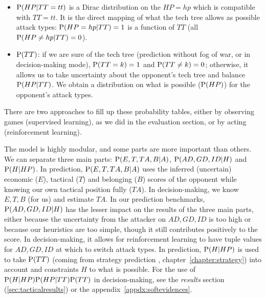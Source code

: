 \begin{itemize}
\item $\mathrm{P}(HP|TT=tt)$ is a Dirac distribution on the $HP=hp$ which is compatible with $TT=tt$. It is the direct mapping of what the tech tree allows as possible attack types: $\mathrm{P}(HP=hp|TT)=1$ is a function of $TT$ (all $\mathrm{P}(HP\neq hp|TT)=0$).

\item $\mathrm{P}(TT)$: if we are sure of the tech tree (prediction without fog of war, or in decision-making mode), $\mathrm{P}(TT=k)=1$ and $\mathrm{P}(TT\neq k)=0$; otherwise, it allows us to take uncertainty about the opponent's tech tree and balance $\mathrm{P}(HP|TT)$. We obtain a distribution on what is possible ($\mathrm{P}(HP)$) for the opponent's attack types.
\end{itemize}

There are two approaches to fill up these probability tables, either by observing games (supervised learning), as we did in the evaluation section, or by acting (reinforcement learning). %

The model is highly modular, and some parts are more important than others. We can separate three main parts: $\mathrm{P}(E,T,TA,B|A)$, $\mathrm{P}(AD,GD,ID|H)$ and $\mathrm{P}(H|HP)$. In prediction, $\mathrm{P}(E,T,TA,B|A)$ uses the inferred (uncertain) economic ($E$), tactical ($T$) and belonging ($B$) scores of the opponent while knowing our own tactical position fully ($TA$). In decision-making, we know $E,T,B$ (for us) and estimate $TA$. In our prediction benchmarks, $\mathrm{P}(AD,GD,ID|H)$ has the lesser impact on the results of the three main parts, either because the uncertainty from the attacker on $AD,GD,ID$ is too high or because our heuristics are too simple, though it still contributes positively to the score. In decision-making, it allows for reinforcement learning to have tuple values for $AD,GD,ID$ at which to switch attack types. In prediction, $\mathrm{P}(H|HP)$ is used to take $\mathrm{P}(TT)$ (coming from strategy prediction \citep{SYNNAEVE:StratPred}, chapter~\ref{chapter:strategy}) into account and constraints $H$ to what is possible. For the use of $\mathrm{P}(H|HP)\mathrm{P}(HP|TT)\mathrm{P}(TT)$ in decision-making, see the \textit{results} section (\ref{sec:tacticalresults}) or the appendix~\ref{appdx:softevidences}.

